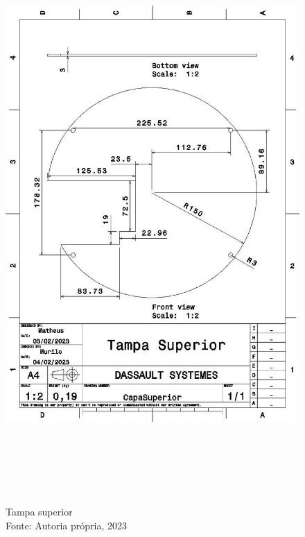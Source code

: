 \newpage
\pagebreak
\begin{figure}[h!]
\centering
\includegraphics[width=16cm,height=22cm]{figuras/Tampa_Superior.jpg}
\caption{Tampa superior\\Fonte: Autoria própria, 2023}
\label{Tampa_Superior}
\end{figure}

